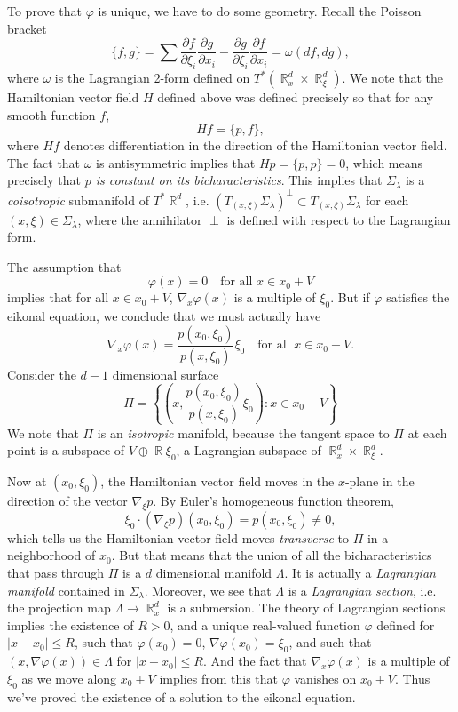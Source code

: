 \documentclass{article}
\theoremstyle{plain}
\theoremstyle{remark}
\theoremstyle{definition}
\DeclareMathOperator{\RR}{\mathbb{R}}
\begin{document}
To prove that $\varphi$ is unique, we have to do some geometry. Recall the Poisson bracket
%
\[ \{ f, g \} = \sum \frac{\partial f}{\partial \xi_i} \frac{\partial g}{\partial x_i} - \frac{\partial g}{\partial \xi_i} \frac{\partial f}{\partial x_i} = \omega \left( df, dg \right), \]
%
where $\omega$ is the Lagrangian 2-form defined on $T^*(\RR^d_x \times \RR^d_\xi)$. We note that the Hamiltonian vector field $H$ defined above was defined precisely so that for any smooth function $f$,
%
\[ Hf = \{ p, f \}, \]
%
where $Hf$ denotes differentiation in the direction of the Hamiltonian vector field. The fact that $\omega$ is antisymmetric implies that $Hp = \{ p, p \} = 0$, which means precisely that \emph{$p$ is constant on its bicharacteristics}. This implies that $\Sigma_\lambda$ is a \emph{coisotropic} submanifold of $T^* \RR^d$, i.e. $(T_{(x,\xi)} \Sigma_\lambda)^\perp \subset T_{(x,\xi)} \Sigma_\lambda$ for each $(x,\xi) \in \Sigma_\lambda$, where the annihilator $\perp$ is defined with respect to the Lagrangian form.

The assumption that
%
\[ \varphi(x) = 0 \quad\text{for all $x \in x_0 + V$} \]
%
implies that for all $x \in x_0 + V$, $\nabla_x \varphi(x)$ is a multiple of $\xi_0$. But if $\varphi$ satisfies the eikonal equation, we conclude that we must actually have
%
\[ \nabla_x \varphi(x) = \frac{p(x_0,\xi_0)}{p(x,\xi_0)} \xi_0 \quad\text{for all $x \in x_0 + V$}. \]
%
Consider the $d-1$ dimensional surface
%
\[ \Pi = \left\{ \left( x, \frac{p(x_0,\xi_0)}{p(x,\xi_0)} \xi_0 \right) : x \in x_0 + V \right\} \]
%
We note that $\Pi$ is an \emph{isotropic} manifold, because the tangent space to $\Pi$ at each point is a subspace of $V \oplus \RR \xi_0$, a Lagrangian subspace of $\RR^d_x \times \RR^d_\xi$.

Now at $(x_0,\xi_0)$, the Hamiltonian vector field moves in the $x$-plane in the direction of the vector $\nabla_\xi p$. By Euler's homogeneous function theorem,
%
\[ \xi_0 \cdot (\nabla_\xi p)(x_0,\xi_0) = p(x_0,\xi_0) \neq 0, \]
%
which tells us the Hamiltonian vector field moves \emph{transverse} to $\Pi$ in a neighborhood of $x_0$. But that means that the union of all the bicharacteristics that pass through $\Pi$ is a $d$ dimensional manifold $\Lambda$. It is actually a \emph{Lagrangian manifold} contained in $\Sigma_\lambda$. Moreover, we see that $\Lambda$ is a \emph{Lagrangian section}, i.e. the projection map $\Lambda \to \RR^d_x$ is a submersion. The theory of Lagrangian sections implies the existence of $R > 0$, and a unique real-valued function $\varphi$ defined for $|x - x_0| \leq R$, such that $\varphi(x_0) = 0$, $\nabla \varphi(x_0) = \xi_0$, and such that $(x,\nabla \varphi(x)) \in \Lambda$ for $|x - x_0| \leq R$. And the fact that $\nabla_x \varphi(x)$ is a multiple of $\xi_0$ as we move along $x_0 + V$ implies from this that $\varphi$ vanishes on $x_0 + V$. Thus we've proved the existence of a solution to the eikonal equation.
\end{document}
